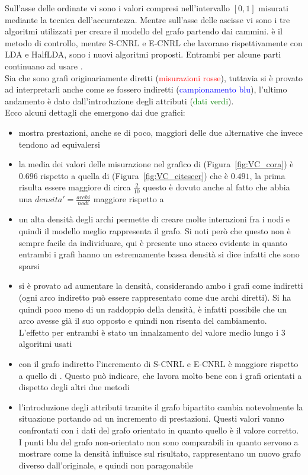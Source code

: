 %
Sull'asse delle ordinate vi sono i valori compresi nell'intervallo $[0, 1]$ misurati mediante la tecnica dell'accuratezza. Mentre sull'asse delle ascisse vi sono i tre algoritmi utilizzati per creare il modello del grafo partendo dai cammini. \wv è il metodo di controllo, mentre S-CNRL e E-CNRL che lavorano rispettivamente con LDA e HalfLDA, sono i nuovi algoritmi proposti. Entrambi per alcune parti continuano ad usare \wv.\\
Sia \cora che \citeseer sono grafi originariamente diretti (\textcolor{red}{misurazioni rosse}), tuttavia si è provato ad interpretarli anche come se fossero indiretti (\textcolor{blue}{campionamento blu}), l'ultimo andamento è dato dall'introduzione degli attributi (\textcolor{green}{dati verdi}).\\
Ecco alcuni dettagli che emergono dai due grafici:
\begin{itemize}
	\item \wv mostra prestazioni, anche se di poco, maggiori delle due alternative che invece tendono ad equivalersi
	\item la media dei valori delle misurazione nel grafico di \cora (Figura~\ref{fig:VC_cora}) è $0.696$ rispetto a quella di \citeseer (Figura~\ref{fig:VC_citeseer}) che è $0.491$, la prima risulta essere maggiore di circa $ \frac{2}{10}$ questo è dovuto anche al fatto che \cora abbia una $ densita' = \frac{archi}{nodi}$ maggiore rispetto a \citeseer
	\item un alta densità degli archi permette di creare molte interazioni fra i nodi e quindi il modello meglio rappresenta il grafo. Si noti però che questo non è sempre facile da individuare, qui è presente uno stacco evidente in quanto entrambi i grafi hanno un estremamente bassa densità si dice infatti che sono sparsi
	\item si è provato ad aumentare la densità, considerando ambo i grafi come indiretti (ogni arco indiretto può essere rappresentato come due archi diretti). Si ha quindi poco meno di un raddoppio della densità, è infatti possibile che un arco avesse già il suo opposto e quindi non risenta del cambiamento.\\
	L'effetto per entrambi è stato un innalzamento del valore medio lungo i 3 algoritmi usati
	\item con il grafo indiretto l'incremento di S-CNRL e E-CNRL è maggiore rispetto a quello di \wv . Questo può indicare, che \wv lavora molto bene con i grafi orientati a dispetto degli altri due metodi
	\item l'introduzione degli attributi tramite il grafo bipartito cambia notevolmente la situazione portando ad un incremento di prestazioni. Questi valori vanno confrontati con i dati del grafo orientato in quanto quello è il valore corretto. I punti blu del grafo non-orientato non sono comparabili in quanto servono a mostrare come la densità influisce sul risultato, rappresentano un nuovo grafo diverso dall'originale, e quindi non paragonabile
\end{itemize}
%
